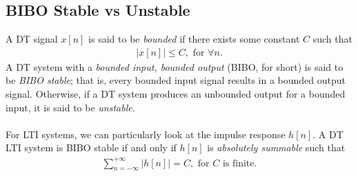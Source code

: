 \documentclass{report}
\begin{document}
\begin{center}
\end{center}

\subsection{BIBO Stable vs Unstable}
A DT signal $x[n]$ is said to be \emph{bounded} if there exists some constant $C$ such that 
\begin{align}
    |x[n]| \leq C, \text{ for } \forall n.
\end{align}
A DT system with a \emph{bounded input, bounded output} (BIBO, for short) is said to be \emph{BIBO stable}; that is, every bounded input signal results in a bounded output signal. Otherwise, if a DT system 
produces an unbounded output for a bounded input, it is said to be \emph{unstable}.
\\ \\
For LTI systems, we can particularly look at the impulse response $h[n]$. A DT LTI system is BIBO stable if and only if $h[n]$ is \emph{absolutely summable} such that
\begin{align}
    \sum_{n=-\infty}^{+\infty} |h[n]| = C, \text{ for $C$ is finite.}
\end{align}
\end{document}
